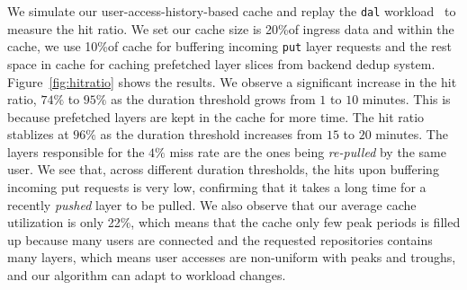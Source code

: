 We simulate our user-access-history-based cache and 
replay the \texttt{dal} workload~\cite{dockerworkload} to measure the hit ratio.
We set our cache size is 20\%of ingress data and 
within the cache, we use 10\%of cache for buffering incoming \texttt{put} layer requests
 and the rest space in cache for caching prefetched layer slices from backend dedup system. 
Figure~\ref{fig:hitratio} shows the results. We observe a significant increase in the hit ratio, $74\%$ to $95\%$ as the duration threshold grows from $1$ to $10$ minutes. This is because prefetched layers are kept in the cache for more time.
The hit ratio stablizes at $96\%$ as the duration threshold increases from $15$ to $20$ minutes.
The layers responsible for the $4\%$ miss rate are the ones being
\emph{re-pulled} by the same user.
We see that, across different duration thresholds, 
the hits upon buffering incoming put requests is very low,
confirming that it takes a long time for a recently \emph{pushed} layer to be pulled.
We also observe that our average cache utilization is only 22\%, which means that
the cache only few peak periods is filled up because many users are connected 
and the requested repositories contains many layers, which means 
user accesses are non-uniform with peaks and troughs,
and our algorithm can adapt to workload changes.
%

